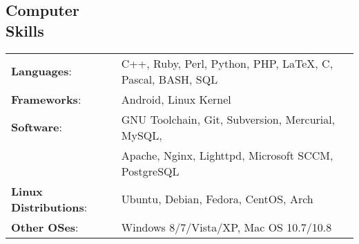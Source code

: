 \documentclass[margin]{res}
\begin{document}
\begin{resume}
    \section{Computer \\ Skills}
      \begin{tabular}{l p{3.6in}}
        \textbf{Languages}:                   & C++, Ruby, Perl, Python, PHP, \LaTeX, C, Pascal, BASH, SQL \\ [1pt]
        \textbf{Frameworks}:                  & Android, Linux Kernel \\ [1pt]
        \textbf{Software}:                    & GNU Toolchain, Git, Subversion, Mercurial, MySQL, \\
                                              & Apache, Nginx, Lighttpd, Microsoft SCCM, PostgreSQL \\ [1pt]
        \textbf{Linux Distributions}:         & Ubuntu, Debian, Fedora, CentOS, Arch \\ [1pt]
        \textbf{Other OSes}:                  & Windows 8/7/Vista/XP, Mac OS 10.7/10.8 \\ [1pt]
      \end{tabular}

  \end{resume} 
\end{document}
